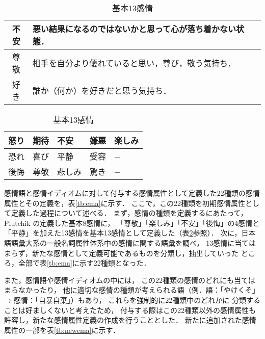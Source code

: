\documentclass[japanese]{jnlp_1.3c}
\begin{document}
\begin{table}[p]
\begin{center}
\begin{tabular}{|c|p{12cm}|}
不安	& 悪い結果になるのではないかと思って心が落ち着かない状態． \\ \hline
尊敬	& 相手を自分より優れていると思い，尊び，敬う気持ち． \\ \hline
好き	& 誰か（何か）を好きだと思う気持ち．\\ \hline
\end{tabular}
\label{tb:ema}
\end{center}
\vspace{\baselineskip}
\begin{center}
\caption{基本13感情}
\begin{tabular}{|p{1.3cm}|p{1.3cm}|p{1.3cm}|p{1.3cm}|p{1.3cm}|}
\hline 
怒り	&	期待	&	不安	&	嫌悪	& 楽しみ \\ \hline
恐れ	&	喜び	&	平静	& 	受容	& −	\\ \hline
後悔	&	尊敬	&	悲しみ	&	驚き	& −	\\ \hline
\end{tabular}
\label{tb:13kind}
\end{center}
\end{table}

感情語と感情イディオムに対して付与する感情属性として定義した22種類の感情属性とその定義を，表\ref{tb:ema}に示す．
ここで，この22種類を初期感情属性として定義した過程について述べる．
まず，感情の種類を定義するにあたって，Plutchik \cite{Plutchik}の定義した基本8感情に，
「尊敬」「楽しみ」「不安」「後悔」の4感情と「平静」を加えた13感情を基本13感情として定義した（表\ref{tb:13kind}参照）．
次に，日本語語彙大系の一般名詞属性体系中の感情に関する語彙を調べ，
13感情に当てはまらず，新たな感情として定義可能であるものを分類し，抽出していった
ところ，全部で表\ref{tb:ema}に示す22種類となった．

また，感情語や感情イディオムの中には，
この22種類の感情のどれにも当てはまらなかったり，
他に適切な感情の種類が考えられる語（例．語：「やけくそ」 → 感情：「自暴自棄」）もあり，
これらを強制的に22種類中のどれかに
分類することは好ましくないと考えたため，
付与する際はこの22種類以外の感情属性も許容し，新たな感情属性定義の作成を行うこととした．
新たに追加された感情属性の一部を表\ref{tb:newema}に示す．
\end{document}
